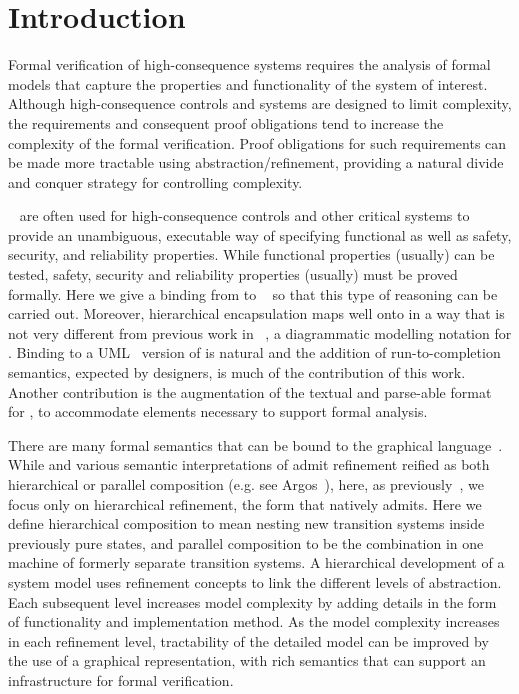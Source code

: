 
\section{Introduction}
\label{sec:introduction}

Formal verification of high-consequence systems requires the analysis
of formal models that capture the properties and functionality of the
system of interest. Although high-consequence controls and systems are
designed to limit complexity, the requirements and consequent proof
obligations tend to increase the complexity of the formal verification.  
Proof obligations for such requirements can be made more tractable using
abstraction/refinement, providing a natural divide and conquer
strategy for controlling complexity.

\Statecharts~\cite{Harel} are often used for high-consequence controls
and other critical systems to provide an unambiguous, executable way
of specifying functional as well as safety, security, and reliability
properties.  While functional properties (usually) can be tested,
safety, security and reliability properties (usually) must be proved
formally.  Here we give a binding from \Statecharts to \EventB~\cite{abrial10:_model_event_b} so that
this type of reasoning can be carried out.  Moreover, hierarchical
encapsulation maps well onto \Statecharts in a way that is not very
different from previous work in \iUMLB~\cite{snook14:_b_statem,Snook2006,Snook12:FMCO}, a diagrammatic modelling notation for \EventB.
Binding \iUMLB to a UML~\cite{Rumbaugh2004} version of \Statecharts is natural and the
addition of run-to-completion semantics, expected by \Statechart
designers, is much of the contribution of this work.  Another
contribution is the augmentation of the textual and parse-able format
for \Statecharts, \SCXML to accommodate elements necessary to support formal
analysis. 

There are many formal semantics that can be bound to 
 the \Statechart graphical language~\cite{Eshuis_2009}. While \Statecharts and various semantic interpretations of
\Statecharts admit refinement reified as both hierarchical or parallel
composition (e.g. see Argos~\cite{Maraninchi91theargos}), here, as
previously~\cite{snook14:_b_statem}, we focus only on hierarchical
refinement, the form that \EventB natively admits.  Here we define
hierarchical composition to mean nesting new transition systems inside
previously pure states, and parallel composition to be the combination
in one machine of formerly separate transition systems.
A hierarchical development of a system model uses refinement
concepts to link the different levels of abstraction. Each subsequent
level increases model complexity by adding details in the form of
functionality and implementation method. As the model complexity
increases in each refinement level, tractability of the detailed model
can be improved by the use of a graphical representation, with rich
semantics that can support an infrastructure for formal verification.


